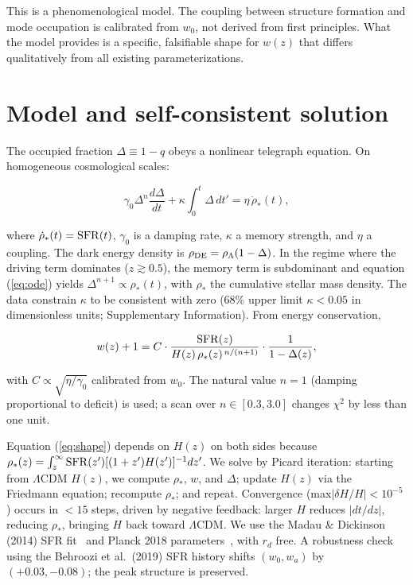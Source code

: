 \documentclass[12pt,a4paper]{article}
\begin{document}
This is a phenomenological model. The coupling between structure formation and mode occupation is calibrated from $w_0$, not derived from first principles. What the model provides is a specific, falsifiable shape for $w(z)$ that differs qualitatively from all existing parameterizations.

\section*{Model and self-consistent solution}

The occupied fraction $\Delta\equiv1-q$ obeys a nonlinear telegraph equation. On homogeneous cosmological scales:

\begin{equation}\label{eq:ode}
\gamma_0\Delta^n\frac{d\Delta}{dt} + \kappa\int_0^t\Delta\,dt' = \eta\,\dot{\rho}_*(t),
\end{equation}

where $\dot{\rho}_*(t)={\rm SFR}(t)$, $\gamma_0$ is a damping rate, $\kappa$ a memory strength, and $\eta$ a coupling. The dark energy density is $\rho_{\rm DE}=\rho_\Lambda(1-\Delta)$. In the regime where the driving term dominates ($z\gtrsim0.5$), the memory term is subdominant and equation (\ref{eq:ode}) yields $\Delta^{n+1}\propto\rho_*(t)$, with $\rho_*$ the cumulative stellar mass density. The data constrain $\kappa$ to be consistent with zero (68\% upper limit $\kappa<0.05$ in dimensionless units; Supplementary Information). From energy conservation,

\begin{equation}\label{eq:shape}
w(z)+1 = C\cdot\frac{{\rm SFR}(z)}{H(z)\,\rho_*(z)^{\,n/(n+1)}}\cdot\frac{1}{1-\Delta(z)},
\end{equation}

with $C\propto\sqrt{\eta/\gamma_0}$ calibrated from $w_0$. The natural value $n=1$ (damping proportional to deficit) is used; a scan over $n\in[0.3,3.0]$ changes $\chi^2$ by less than one unit.

Equation (\ref{eq:shape}) depends on $H(z)$ on both sides because $\rho_*(z)=\int_z^\infty{\rm SFR}(z')[(1+z')H(z')]^{-1}dz'$. We solve by Picard iteration: starting from $\Lambda$CDM $H(z)$, we compute $\rho_*$, $w$, and $\Delta$; update $H(z)$ via the Friedmann equation; recompute $\rho_*$; and repeat. Convergence (max$|\delta H/H|<10^{-5}$) occurs in $<15$ steps, driven by negative feedback: larger $H$ reduces $|dt/dz|$, reducing $\rho_*$, bringing $H$ back toward $\Lambda$CDM. We use the Madau \& Dickinson (2014) SFR fit~\cite{madau2014} and Planck 2018 parameters~\cite{planck2018}, with $r_d$ free. A robustness check using the Behroozi et al.\ (2019) SFR history shifts $(w_0,w_a)$ by $(+0.03,-0.08)$; the peak structure is preserved.
\end{document}
